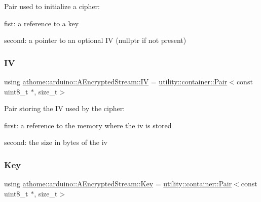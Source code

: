 Pair used to initialize a cipher\+:
\begin{DoxyItemize}
\item fist\+: a reference to a key
\item second\+: a pointer to an optional IV (nullptr if not present) 
\end{DoxyItemize}\mbox{\label{classathome_1_1arduino_1_1_a_encrypted_stream_a4a0c027bc7503bb0da538d6a2f0657e6}} 
\subsubsection{\texorpdfstring{IV}{IV}}
{\footnotesize\ttfamily using \mbox{\hyperlink{classathome_1_1arduino_1_1_a_encrypted_stream_a4a0c027bc7503bb0da538d6a2f0657e6}{athome\+::arduino\+::\+A\+Encrypted\+Stream\+::\+IV}} =  \mbox{\hyperlink{classathome_1_1utility_1_1container_1_1_pair}{utility\+::container\+::\+Pair}}$<$const uint8\+\_\+t $\ast$, size\+\_\+t$>$}

Pair storing the IV used by the cipher\+:


\begin{DoxyItemize}
\item first\+: a reference to the memory where the iv is stored
\item second\+: the size in bytes of the iv 
\end{DoxyItemize}\mbox{\label{classathome_1_1arduino_1_1_a_encrypted_stream_a2f0fd4a9c2a74a4ae857a4447aa3956f}} 
\subsubsection{\texorpdfstring{Key}{Key}}
{\footnotesize\ttfamily using \mbox{\hyperlink{classathome_1_1arduino_1_1_a_encrypted_stream_a2f0fd4a9c2a74a4ae857a4447aa3956f}{athome\+::arduino\+::\+A\+Encrypted\+Stream\+::\+Key}} =  \mbox{\hyperlink{classathome_1_1utility_1_1container_1_1_pair}{utility\+::container\+::\+Pair}}$<$const uint8\+\_\+t $\ast$, size\+\_\+t$>$}

